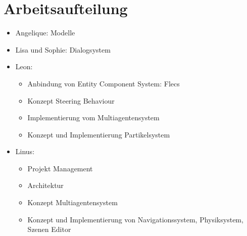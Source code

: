 

\section{Arbeitsaufteilung}

\begin{itemize}
\item Angelique: Modelle
\item Lisa und Sophie: Dialogsystem
\item Leon:
\begin{itemize}
\item Anbindung von Entity Component System: Flecs
\item Konzept Steering Behaviour
\item Implementierung vom Multiagentensystem
\item Konzept und Implementierung Partikelsystem
\end{itemize}
\item Linus:
\begin{itemize}
\item Projekt Management
\item Architektur
\item Konzept Multiagentensystem
\item Konzept und Implementierung von Navigationssystem, Physiksystem, Szenen Editor
\end{itemize}
\end{itemize}